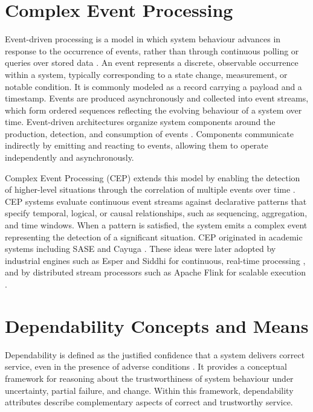\section{Complex Event Processing}\label{sec:background-cep}
Event-driven processing is a model in which system behaviour advances in response to the occurrence of events, rather than through continuous polling or queries over stored data \cite{kommera2020power}. An event represents a discrete, observable occurrence within a system, typically corresponding to a state change, measurement, or notable condition. It is commonly modeled as a record carrying a payload and a timestamp. Events are produced asynchronously and collected into event streams, which form ordered sequences reflecting the evolving behaviour of a system over time. Event-driven architectures organize system components around the production, detection, and consumption of events \cite{manchana2021event}. Components communicate indirectly by emitting and reacting to events, allowing them to operate independently and asynchronously.

Complex Event Processing (CEP) extends this model by enabling the detection of higher-level situations through the correlation of multiple events over time \cite{cugola2015complex}. CEP systems evaluate continuous event streams against declarative patterns that specify temporal, logical, or causal relationships, such as sequencing, aggregation, and time windows. When a pattern is satisfied, the system emits a complex event representing the detection of a significant situation. CEP originated in academic systems including SASE and Cayuga \cite{wu2006high,brenna2007cayuga}. These ideas were later adopted by industrial engines such as Esper and Siddhi for continuous, real-time processing \cite{esper_reference,suhothayan2011siddhi}, and by distributed stream processors such as Apache Flink for scalable execution \cite{carbone2015apache}.


\section{Dependability Concepts and Means}\label{sec:background-dependability}
Dependability is defined as the justified confidence that a system delivers correct service, even in the presence of adverse conditions \cite{avizienis2004basic}. It provides a conceptual framework for reasoning about the trustworthiness of system behaviour under uncertainty, partial failure, and change. Within this framework, dependability attributes describe complementary aspects of correct and trustworthy service.

